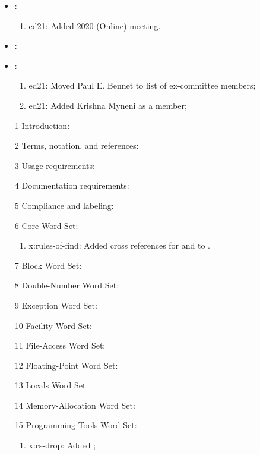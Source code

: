 
	\begin{itemize}
	\item {}:						%
		\begin{enumerate}
			\item \textsf{ed21}: Added 2020 (Online) meeting.
		\end{enumerate}
	\item {}:						%
	\item {}:					%
		\begin{enumerate}
			\item \textsf{ed21}: Moved Paul E. Bennet to list of ex-committee members;
			\item \textsf{ed21}: Added Krishna Myneni as a member;
		\end{enumerate}
	\item[1] Introduction:						%
	\item[2] Terms, notation, and references:	%
	\item[3] Usage requirements:				%
	\item[4] Documentation requirements:	%
	\item[5] Compliance and labeling:		%
	\item[6] Core Word Set:					%
		\begin{enumerate}
		\item \textsf{x:rules-of-find}: Added cross references for
			 and 
			to .
		\end{enumerate}
	\item[7] Block Word Set:					%
	\item[8] Double-Number Word Set:		%
	\item[9] Exception Word Set:				%
	\item[10] Facility Word Set:				%
	\item[11] File-Access Word Set:			%
	\item[12] Floating-Point Word Set:		%
	\item[13] Locals Word Set:				%
	\item[14] Memory-Allocation Word Set:	%
	\item[15] Programming-Tools Word Set:	%
		\begin{enumerate}
		\item \textsf{x:cs-drop}: Added ;

\end{enumerate}
\end{itemize}
